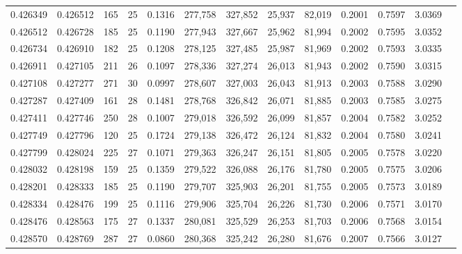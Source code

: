 \begin{tabular}{rrrrrrrrrrrrr}
0.426349 & 0.426512 &   165 &  25 &                                     0.1316 & 277,758 & 327,852 &  25,937 &  82,019 & 0.2001 & 0.7597 & 3.0369 \\
0.426512 & 0.426728 &   185 &  25 &                                     0.1190 & 277,943 & 327,667 &  25,962 &  81,994 & 0.2002 & 0.7595 & 3.0352 \\
0.426734 & 0.426910 &   182 &  25 &                                     0.1208 & 278,125 & 327,485 &  25,987 &  81,969 & 0.2002 & 0.7593 & 3.0335 \\
0.426911 & 0.427105 &   211 &  26 &                                     0.1097 & 278,336 & 327,274 &  26,013 &  81,943 & 0.2002 & 0.7590 & 3.0315 \\
0.427108 & 0.427277 &   271 &  30 &                                     0.0997 & 278,607 & 327,003 &  26,043 &  81,913 & 0.2003 & 0.7588 & 3.0290 \\
0.427287 & 0.427409 &   161 &  28 &                                     0.1481 & 278,768 & 326,842 &  26,071 &  81,885 & 0.2003 & 0.7585 & 3.0275 \\
0.427411 & 0.427746 &   250 &  28 &                                     0.1007 & 279,018 & 326,592 &  26,099 &  81,857 & 0.2004 & 0.7582 & 3.0252 \\
0.427749 & 0.427796 &   120 &  25 &                                     0.1724 & 279,138 & 326,472 &  26,124 &  81,832 & 0.2004 & 0.7580 & 3.0241 \\
0.427799 & 0.428024 &   225 &  27 &                                     0.1071 & 279,363 & 326,247 &  26,151 &  81,805 & 0.2005 & 0.7578 & 3.0220 \\
0.428032 & 0.428198 &   159 &  25 &                                     0.1359 & 279,522 & 326,088 &  26,176 &  81,780 & 0.2005 & 0.7575 & 3.0206 \\
0.428201 & 0.428333 &   185 &  25 &                                     0.1190 & 279,707 & 325,903 &  26,201 &  81,755 & 0.2005 & 0.7573 & 3.0189 \\
0.428334 & 0.428476 &   199 &  25 &                                     0.1116 & 279,906 & 325,704 &  26,226 &  81,730 & 0.2006 & 0.7571 & 3.0170 \\
0.428476 & 0.428563 &   175 &  27 &                                     0.1337 & 280,081 & 325,529 &  26,253 &  81,703 & 0.2006 & 0.7568 & 3.0154 \\
0.428570 & 0.428769 &   287 &  27 &                                     0.0860 & 280,368 & 325,242 &  26,280 &  81,676 & 0.2007 & 0.7566 & 3.0127 \\

\end{tabular}
